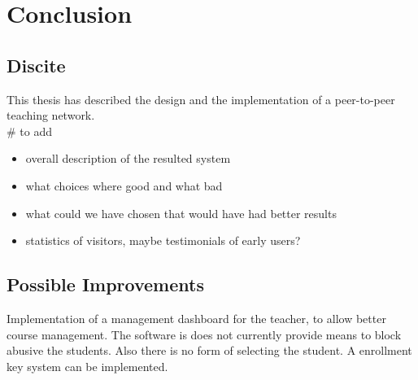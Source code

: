 
\chapter{Conclusion}
\label{Chapter4}
\section{Discite}
This thesis has described the design and the implementation of a peer-to-peer
teaching network.\\
\# to add
\begin{itemize}
\item overall description of the resulted system
\item what choices where good and what bad
\item what could we have chosen that would have had better results
\item statistics of visitors, maybe testimonials of early users?
\end{itemize}
\section{Possible Improvements}
Implementation of a management dashboard for the teacher, to allow better course
management. The software is does not currently provide means to block abusive
the students. Also there is no form of selecting the student. A enrollment key
system can be implemented.
